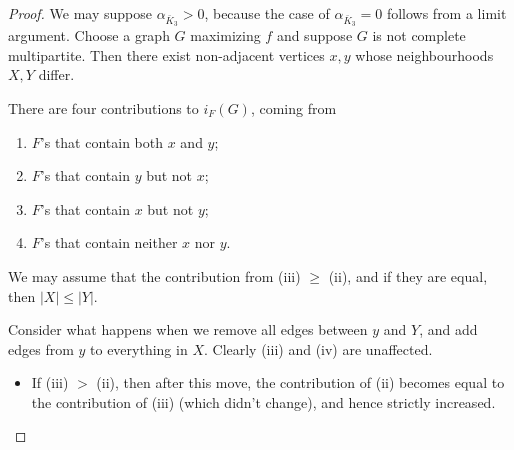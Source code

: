 \documentclass[a4paper]{article}
\begin{document}
\begin{proof}
  We may suppose $\alpha_{\bar{K}_3} > 0$, because the case of $\alpha_{\bar{K}_3} = 0$ follows from a limit argument. Choose a graph $G$ maximizing $f$ and suppose $G$ is not complete multipartite. Then there exist non-adjacent vertices $x, y$ whose neighbourhoods $X, Y$ differ.

  There are four contributions to $i_F(G)$, coming from
  \begin{enumerate}
    \item $F$'s that contain both $x$ and $y$;
    \item $F$'s that contain $y$ but not $x$;
    \item $F$'s that contain $x$ but not $y$;
    \item $F$'s that contain neither $x$ nor $y$.
  \end{enumerate}
  We may assume that the contribution from (iii) $\geq$ (ii), and if they are equal, then $|X| \leq |Y|$.

  Consider what happens when we remove all edges between $y$ and $Y$, and add edges from $y$ to everything in $X$. Clearly (iii) and (iv) are unaffected.
  \begin{itemize}
    \item If (iii) $>$ (ii), then after this move, the contribution of (ii) becomes equal to the contribution of (iii) (which didn't change), and hence strictly increased.


\end{itemize}
\end{proof}
\end{document}

